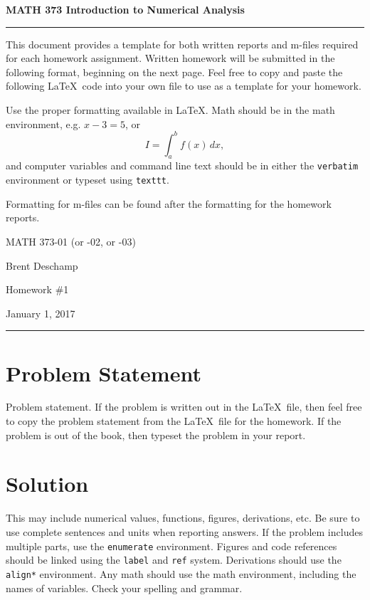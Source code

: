 \documentclass[11pt]{article}
\begin{document}
\begin{center}

\Large

\textbf{MATH 373 Introduction to Numerical Analysis}

\normalsize

\end{center}

\medskip

\hrule   %

\bigskip

This document provides a template for both written reports and m-files required for each homework assignment.  Written homework will be submitted in the following format, beginning on the next page.  Feel free to copy and paste the following \LaTeX\ code into your own file to use as a template for your homework.

Use the proper formatting available in \LaTeX.  Math should be in the math environment, e.g. $x-3=5$, or $$I = \int_a^b f(x) \, dx,$$ and computer variables and command line text should be in either the \texttt{verbatim} environment or typeset using \texttt{texttt}.

Formatting for m-files can be found after the formatting for the homework reports.

\pagebreak


MATH 373-01 (or -02, or -03)

Brent Deschamp

Homework \#1

January 1, 2017

\medskip\hrule\medskip

\section{Problem Statement}

Problem statement.  If the problem is written out in the \LaTeX\ file, then feel free to copy the problem statement from the \LaTeX\ file for the homework.  If the problem is out of the book, then typeset the problem in your report.

\section{Solution}

This may include numerical values, functions, figures, derivations, etc.  Be sure to use complete sentences and units when reporting answers.  If the problem includes multiple parts, use the \texttt{enumerate} environment.  Figures and code references should be linked using the \texttt{label} and \texttt{ref} system.  Derivations should use the \texttt{align*} environment.  Any math should use the math environment, including the names of variables.  Check your spelling and grammar.
\end{document}
